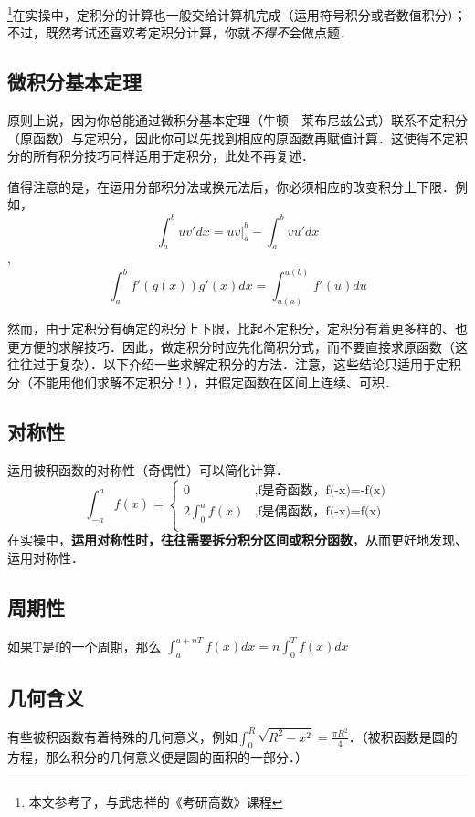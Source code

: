 
\begin{issues}
\issueDraft
\end{issues}


\footnote{本文参考了\cite{同济高}，\cite{Thomas}与武忠祥的《考研高数》课程}在实操中，定积分的计算也一般交给计算机完成（运用符号积分或者数值积分）；不过，既然考试还喜欢考定积分计算，你就\textsl{不得不}会做点题．

\subsection{微积分基本定理}
原则上说，因为你总能通过微积分基本定理（牛顿—莱布尼兹公式）联系不定积分（原函数）与定积分，因此你可以先找到相应的原函数再赋值计算．这使得不定积分的所有积分技巧同样适用于定积分，此处不再复述．

值得注意的是，在运用分部积分法或换元法后，你必须相应的改变积分上下限．例如，$$\int^b_a uv'dx = uv|^b_a-\int^b_a vu'dx$$, 
$$\int^b_a f'(g(x))g'(x)dx = \int ^{u(b)}_{u(a)} f'(u)du$$

然而，由于定积分有确定的积分上下限，比起不定积分，定积分有着更多样的、也更方便的求解技巧．因此，做定积分时应先化简积分式，而不要直接求原函数（这往往过于复杂）．以下介绍一些求解定积分的方法．注意，这些结论只适用于定积分（不能用他们求解不定积分！），并假定函数在区间上连续、可积．

\subsection{对称性}
运用被积函数的对称性（奇偶性）可以简化计算．
$$
\int ^a_{-a} f(x) = 
\left \{
\begin{aligned}
0&,\text{f是奇函数，f(-x)=-f(x)}\\
2\int ^a_0 f(x)&,\text{f是偶函数，f(-x)=f(x)}\\
\end{aligned}
\right.
$$
在实操中，\textbf{运用对称性时，往往需要拆分积分区间或积分函数}，从而更好地发现、运用对称性．

\subsection{周期性}
如果T是f的一个周期，那么 $\int ^{a+nT}_{a} f(x)dx= n\int^{T}_0 f(x)dx$

\subsection{几何含义}
有些被积函数有着特殊的几何意义，例如$\int ^R_0 \sqrt{R^2-x^2}=\frac{\pi R^2}{4}$．（被积函数是圆的方程，那么积分的几何意义便是圆的面积的一部分．）

